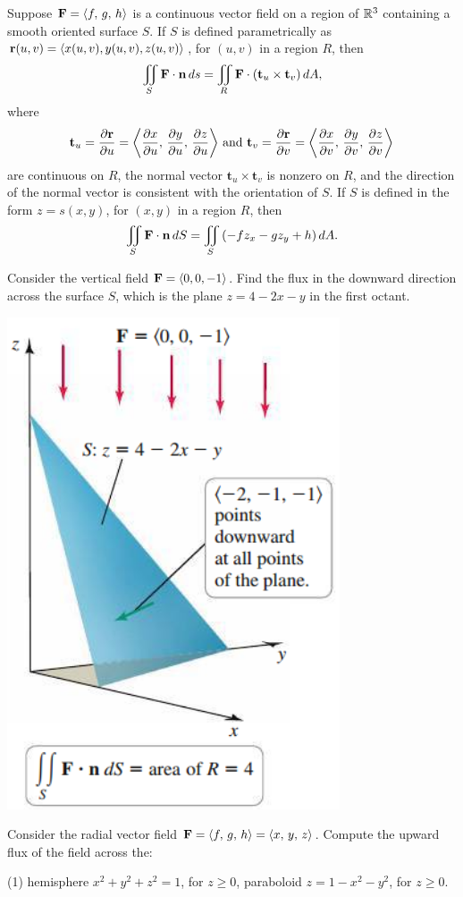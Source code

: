 \documentclass[mathNotesPreamble]{subfiles}
\begin{document}
  \begin{defn*}
    Suppose $\mathbf F={\left\langle f,\,g,\,h \right\rangle}$ is a continuous vector field on a region of $\mathbb{R}^3$ containing a smooth oriented surface $S$. If $S$ is defined parametrically as ${\mathbf{r}}(u,v)={\left\langle x(u,v),y(u,v),z(u,v) \right\rangle}$, for $(u,v)$ in a region $R$, then
      \[\iint\limits_S \mathbf F\cdot{\mathbf{n}}\,ds = \iint\limits_R \mathbf F\cdot{\left(\mathbf t_u\times\mathbf t_v\right)}\,dA,\]
    where 
      \[\displaystyle\mathbf t_u=\frac{\partial {\mathbf{r}}}{\partial u}={\left\langle \frac{\partial x}{\partial u},\,\frac{\partial y}{\partial u},\,\frac{\partial z}{\partial u} \right\rangle}
      \textnormal{ and }
      \displaystyle\mathbf t_v=\frac{\partial {\mathbf{r}}}{\partial v}={\left\langle \frac{\partial x}{\partial v},\,\frac{\partial y}{\partial v},\,\frac{\partial z}{\partial v} \right\rangle}\] 
    are continuous on $R$, the normal vector $\mathbf t_u\times\mathbf t_v$ is nonzero on $R$, and the direction of the normal vector is consistent with the orientation of $S$. If $S$ is defined in the form $z=s(x,y)$, for $(x,y)$ in a region $R$, then 
      \[\iint\limits_S \mathbf F\cdot{\mathbf{n}}\,dS=\iint\limits_S {\left(-fz_x-gz_y+h\right)}\,dA.\]
  \end{defn*}
  \pagebreak

  \begin{ex*}
    Consider the vertical field $\mathbf F={\left\langle 0,0,-1 \right\rangle}$. Find the flux in the downward direction across the surface $S$, which is the plane $z=4-2x-y$ in the first octant.
  \end{ex*}
  \begin{flushright}
    \includegraphics[width=0.25\linewidth]{images/briggs_17_06/fig17_58}
  \end{flushright}
  \pagebreak

  \begin{ex*}
    Consider the radial vector field $\mathbf F={\left\langle f,\,g,\,h \right\rangle}={\left\langle x,\,y,\,z \right\rangle}$.  Compute the upward flux of the field across the:
  \end{ex*}
  \begin{tasks}[after-item-skip=\stretch{1}, label=](1)
    \task hemisphere $x^2+y^2+z^2=1$, for $z\geq 0$,
    \task paraboloid $z=1-x^2-y^2$, for $z\geq 0$.
  \end{tasks}
  \pagebreak
\end{document}
